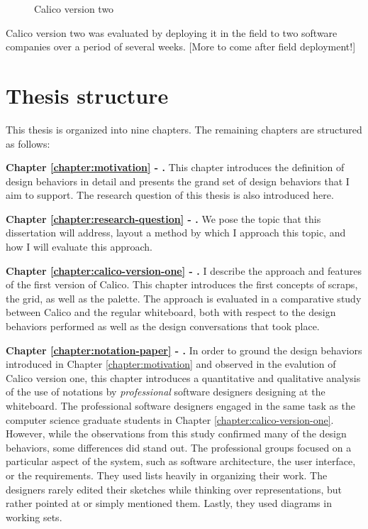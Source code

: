 \begin{figure}
  \centering
   \caption {Calico version two}
   \label{fig:calico-version-two}
\end{figure}

Calico version two was evaluated by deploying it in the field to two software companies over a period of several weeks. [More to come after field deployment!]

\section{Thesis structure}

This thesis is organized into nine chapters. The remaining chapters are structured as follows:

\textbf{Chapter \ref{chapter:motivation} - .} This chapter introduces the definition of design behaviors in detail and presents the grand set of design behaviors that I aim to support. The research question of this thesis is also introduced here.

\textbf{Chapter \ref{chapter:research-question} - .} We pose the topic that this dissertation will address, layout a method by which I approach this topic, and how I will evaluate this approach.

\textbf{Chapter \ref{chapter:calico-version-one} - .} I describe the approach and features of the first version of Calico. This chapter introduces the first concepts of scraps, the grid, as well as the palette. The approach is evaluated in a comparative study between Calico and the regular whiteboard, both with respect to the design behaviors performed as well as the design conversations that took place.

\textbf{Chapter \ref{chapter:notation-paper} - .} In order to ground the design behaviors introduced in Chapter \ref{chapter:motivation} and observed in the evalution of Calico version one, this chapter introduces a quantitative and qualitative analysis of the use of notations by \emph{professional} software designers designing at the whiteboard. The professional software designers engaged in the same task as the computer science graduate students in Chapter \ref{chapter:calico-version-one}. However, while the observations from this study confirmed many of the design behaviors, some differences did stand out. The professional groups focused on a particular aspect of the system, such as software architecture, the user interface, or the requirements. They used lists heavily in organizing their work. The designers rarely edited their sketches while thinking over representations, but rather pointed at or simply mentioned them. Lastly, they used diagrams in working sets.

